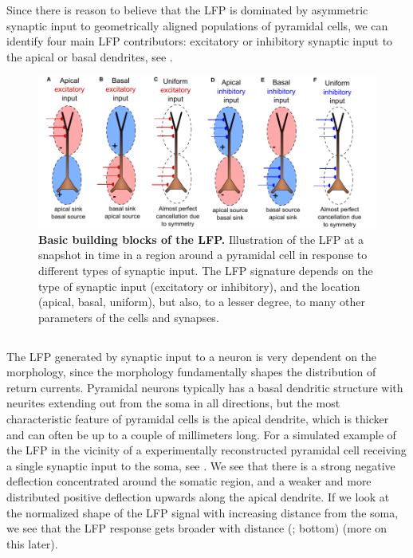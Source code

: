 Since there is reason to believe that the LFP is dominated by asymmetric synaptic input to geometrically aligned populations of pyramidal cells, we can identify four main LFP contributors: excitatory or inhibitory synaptic input to the apical or basal dendrites, see .

\begin{figure}[!ht]
\begin{center}
\includegraphics[width=.7\textwidth]{Figures/LFP/dipole_basics.pdf}
\end{center}
\caption{\textbf{Basic building blocks of the LFP.}
Illustration of the LFP at a snapshot in time in a region around a pyramidal
cell in response to different types of synaptic input. The LFP signature depends on the type of synaptic input (excitatory or inhibitory), and the location (apical, basal, uniform), but also, to a lesser degree, to many other parameters of the cells and synapses.
}
\label{fig:LFP:LFP_lego}
\end{figure}

\subsection{}
\label{sec:LFP:morph_matters}

The LFP generated by synaptic input to a neuron is very dependent on the morphology, since the morphology fundamentally shapes the distribution of return currents. 
Pyramidal neurons typically has a basal dendritic structure with neurites extending out from the soma in all directions, but the most characteristic feature of pyramidal cells is the apical dendrite, which is thicker and can often be up to a couple of millimeters long.
For a simulated example of the LFP in the vicinity of a experimentally reconstructed pyramidal cell receiving a single synaptic input to the soma, see . We see that there is a strong negative deflection concentrated around the somatic region, and a weaker and more distributed positive deflection upwards along the apical dendrite. If we look at the normalized shape of the LFP signal with increasing distance from the soma, we see that the LFP response gets broader with distance (; bottom) (more on this later).

